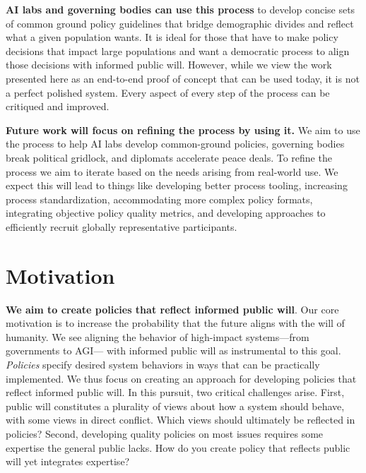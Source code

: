 \documentclass{article}
\begin{document}
\textbf{AI labs and governing bodies can use this process} to develop concise sets of common ground policy guidelines that bridge demographic divides and reflect what a given population wants. It is ideal for those that have to make policy decisions that impact large populations and want a democratic process to align those decisions with informed public will. However, while we view the work presented here as an end-to-end proof of concept that can be used today, it is not a perfect polished system. Every aspect of every step of the process can be critiqued and improved. 

\textbf{Future work will focus on refining the process by using it.} We aim to use the process to help AI labs develop common-ground policies, governing bodies break political gridlock, and diplomats accelerate peace deals. To refine the process we aim to iterate based on the needs arising from real-world use. We expect this will lead to things like developing better process tooling, increasing process standardization, accommodating more complex policy formats, integrating objective policy quality metrics, and developing approaches to efficiently recruit globally representative participants. 


\newpage

\section{Motivation}
\textbf{We aim to create policies that reflect informed public will}. Our core motivation is to increase the probability that the future aligns with the will of humanity. We see aligning the behavior of high-impact systems---from governments to AGI--- with informed public will as instrumental to this goal. \emph{Policies} specify desired system behaviors in ways that can be practically implemented. We thus focus on creating an approach for developing policies that reflect informed public will. In this pursuit, two critical challenges arise. First, public will constitutes a plurality of views about how a system should behave, with some views in direct conflict. Which views should ultimately be reflected in policies? Second, developing quality policies on most issues requires some expertise the general public lacks. How do you create policy that reflects public will yet integrates expertise?
\end{document}
